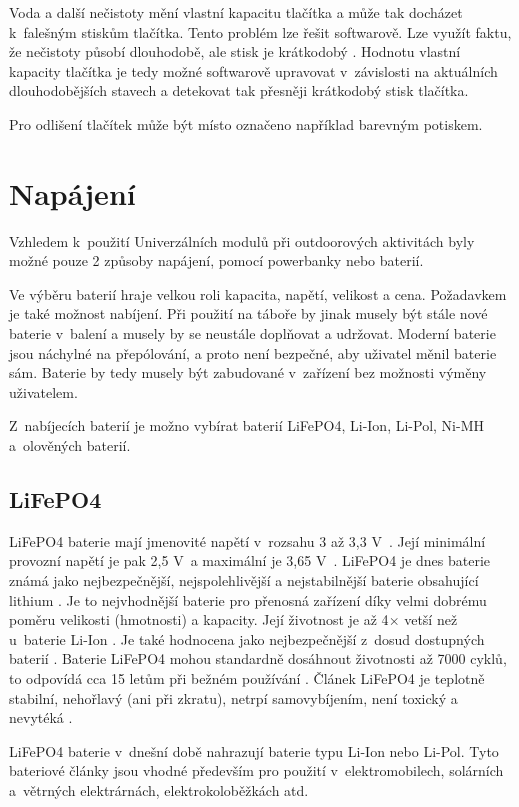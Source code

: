 Voda a další nečistoty mění vlastní kapacitu tlačítka a může tak docházet k~falešným stiskům tlačítka. Tento problém lze řešit softwarově. 
Lze využít faktu, že nečistoty působí dlouhodobě, ale stisk je krátkodobý \cite{PrincipKapTl}. Hodnotu vlastní kapacity tlačítka je tedy
možné softwarově upravovat v~závislosti na aktuálních dlouhodobějších stavech a detekovat tak přesněji krátkodobý stisk tlačítka.

Pro odlišení tlačítek může být místo označeno například barevným potiskem. 

\section{Napájení}
Vzhledem k~použití Univerzálních modulů při outdoorových aktivitách byly možné pouze 2 způsoby napájení, pomocí powerbanky nebo baterií. 

Ve výběru baterií hraje velkou roli kapacita, napětí, velikost a cena. Požadavkem je také možnost nabíjení. Při použití na táboře by jinak musely být stále 
nové baterie v~balení a musely by se neustále doplňovat a udržovat. Moderní baterie jsou náchylné na přepólování, a proto není bezpečné, aby uživatel měnil baterie sám. Baterie by tedy musely být zabudované v~zařízení 
bez možnosti výměny uživatelem. 

Z~nabíjecích baterií je možno vybírat baterií LiFePO4, Li-Ion, Li-Pol, Ni-MH a~olověných baterií.

\subsection{LiFePO4}
LiFePO4 baterie mají jmenovité napětí v~rozsahu 3 až 3,3 V~\cite{LiFePO4_malina}. Její minimální provozní napětí je pak 2,5 V~a maximální je 3,65 V~\cite{LiFePO4_malina}.
LiFePO4 je dnes baterie známá jako nejbezpečnější, nejspolehlivější a nejstabilnější baterie obsahující lithium \cite{LiFePO4_malina}. Je to nejvhodnější baterie pro 
přenosná zařízení díky velmi dobrému poměru velikosti (hmotnosti) a kapacity. Její životnost je až 4$\times$ vetší než u~baterie Li-Ion \cite{LiFePO4_malina}. Je také hodnocena
jako nejbezpečnější z~dosud dostupných baterií \cite{LiFePO4_malina}. Baterie LiFePO4 mohou standardně dosáhnout životnosti až 7000 cyklů, to odpovídá cca 15 letům při bežném
používání \cite{LiFePO4_malina}. Článek LiFePO4 je teplotně stabilní, nehořlavý (ani při zkratu), netrpí samovybíjením, není toxický a nevytéká \cite{LiFePO4_malina}.

LiFePO4 baterie v~dnešní době nahrazují baterie typu Li-Ion nebo Li-Pol.
Tyto bateriové články jsou vhodné především pro použití v~elektromobilech, solárních a~větrných elektrárnách, elektrokoloběžkách atd. 

